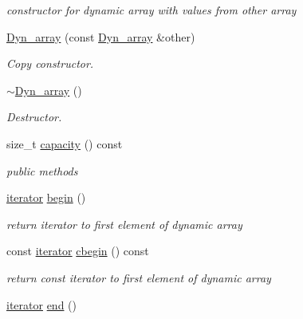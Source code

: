 \begin{DoxyCompactItemize}
\begin{DoxyCompactList}\small\item\em constructor for dynamic array with values from other array \end{DoxyCompactList}\item 
\hyperlink{classDyn__array_a83d19f61fc7cef07e8125911729fd3bf}{Dyn\+\_\+array} (const \hyperlink{classDyn__array}{Dyn\+\_\+array} \&other)
\begin{DoxyCompactList}\small\item\em Copy constructor. \end{DoxyCompactList}\item 
\mbox{\label{classDyn__array_ae614e37ca129444d7125483d461fa8d5}} 
\hyperlink{classDyn__array_ae614e37ca129444d7125483d461fa8d5}{$\sim$\+Dyn\+\_\+array} ()
\begin{DoxyCompactList}\small\item\em Destructor. \end{DoxyCompactList}\item 
size\+\_\+t \hyperlink{classDyn__array_a36c5289ec13ee40366fe3b095b2347bf}{capacity} () const
\begin{DoxyCompactList}\small\item\em public methods \end{DoxyCompactList}\item 
\hyperlink{classDyn__array_1_1iterator}{iterator} \hyperlink{classDyn__array_ad6191fc9efb3505a13de70bc0cc5db3e}{begin} ()
\begin{DoxyCompactList}\small\item\em return iterator to first element of dynamic array \end{DoxyCompactList}\item 
\mbox{\label{classDyn__array_aad61b279bf883aa67f904a93dc1622e1}} 
const \hyperlink{classDyn__array_1_1iterator}{iterator} \hyperlink{classDyn__array_aad61b279bf883aa67f904a93dc1622e1}{cbegin} () const
\begin{DoxyCompactList}\small\item\em return const iterator to first element of dynamic array \end{DoxyCompactList}\item 
\mbox{\label{classDyn__array_af728c3e6b4191f59dfea556dd506ccdc}} 
\hyperlink{classDyn__array_1_1iterator}{iterator} \hyperlink{classDyn__array_af728c3e6b4191f59dfea556dd506ccdc}{end} ()

\end{DoxyCompactItemize}
